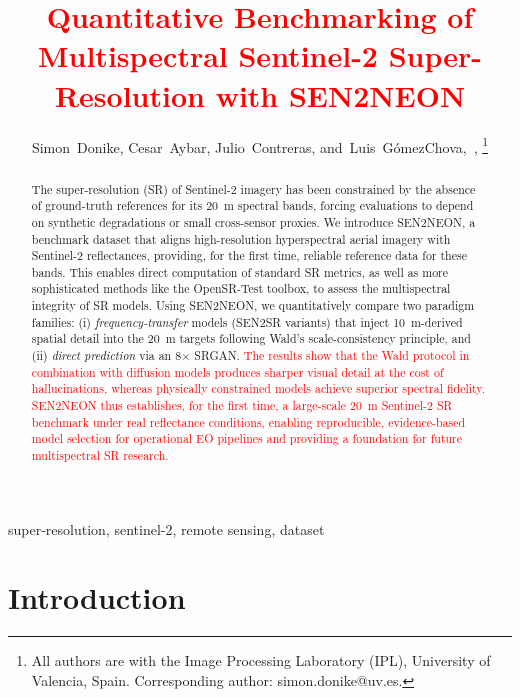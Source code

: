 \documentclass[journal]{IEEEtran}
\title{\textcolor{red}{Quantitative Benchmarking of Multispectral Sentinel-2 Super-Resolution with SEN2NEON}}
\author{Simon~Donike\orcidlink{0000-0002-4440-3835},
        Cesar~Aybar\orcidlink{0000-0003-2745-9535},
        Julio~Contreras\orcidlink{0009-0001-5408-7055},
        and~Luis~Gómez\textendash Chova\orcidlink{0000-0003-3924-1269},~\IEEEmembership{Senior Member,~IEEE},%
\thanks{All authors are with the Image Processing Laboratory (IPL), University of Valencia, Spain. Corresponding author: simon.donike@uv.es.}}
\begin{document}
\maketitle

\begin{abstract}
The super-resolution (SR) of Sentinel-2 imagery has been constrained by the absence of ground-truth references for its \SI{20}{m} spectral bands,  forcing evaluations to depend on synthetic degradations or small cross-sensor proxies. We introduce SEN2NEON, a benchmark dataset that aligns high-resolution hyperspectral aerial imagery with Sentinel-2 reflectances, providing, for the first time, reliable reference data for these bands. This enables direct computation of standard SR metrics, as well as more sophisticated methods like the OpenSR-Test toolbox, to assess the multispectral integrity of SR models. Using SEN2NEON, we quantitatively compare two paradigm families: (i) \emph{frequency-transfer} models (SEN2SR variants) that inject \SI{10}{m}-derived spatial detail into the \SI{20}{m} targets following Wald’s scale-consistency principle, and (ii) \emph{direct prediction} via an 8$\times$ SRGAN. \textcolor{red}{The results show that the Wald protocol in combination with diffusion models produces sharper visual detail at the cost of hallucinations, whereas physically constrained models achieve superior spectral fidelity. SEN2NEON thus establishes, for the first time, a large-scale \SI{20}{m} Sentinel-2 SR benchmark under real reflectance conditions, enabling reproducible, evidence-based model selection for operational EO pipelines and providing a foundation for future multispectral SR research.}
\end{abstract}

\begin{IEEEkeywords}
super-resolution, sentinel-2, remote sensing, dataset
\end{IEEEkeywords}

\section{Introduction}
\end{document}
